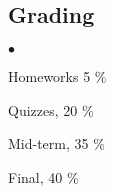 \documentclass[margin,line]{res}
\newenvironment{list2}{
  \begin{list}{$\bullet$}{%
      \setlength{\itemsep}{0in}
      \setlength{\parsep}{0in} \setlength{\parskip}{0in}
      \setlength{\topsep}{0in} \setlength{\partopsep}{0in}
      \setlength{\leftmargin}{0.2in}}}{\end{list}}
\begin{document}
\begin{resume}
\section{\sc Grading}
\begin{list2}
\item Homeworks 5 \%
\item Quizzes, 20 \%
\item Mid-term, 35 \%
\item Final, 40 \%
\end{list2}


\end{resume}
\end{document}
